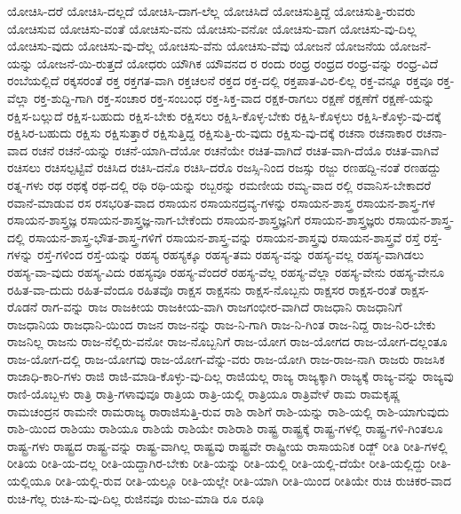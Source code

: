 {ಯೋಚಿಸಿ-ದರೆ
ಯೋಚಿಸಿ-ದಲ್ಲದೆ
ಯೋಚಿಸಿ-ದಾಗ-ಲೆಲ್ಲ
ಯೋಚಿಸಿದೆ
ಯೋಚಿಸುತ್ತಿದ್ದೆ
ಯೋಚಿಸುತ್ತಿ-ರುವರು
ಯೋಚಿಸುವ
ಯೋಚಿಸು-ವಂತೆ
ಯೋಚಿಸು-ವನು
ಯೋಚಿಸು-ವನೋ
ಯೋಚಿಸು-ವಾಗ
ಯೋಚಿಸು-ವು-ದಿಲ್ಲ
ಯೋಚಿಸು-ವುದು
ಯೋಚಿಸು-ವು-ದೆಲ್ಲ
ಯೋಚಿಸು-ವೆನು
ಯೋಚಿಸು-ವೆವು
ಯೋಜನೆ
ಯೋಜನೆಯ
ಯೋಜನೆ-ಯನ್ನು
ಯೋಜನೆ-ಯಿ-ರುತ್ತದೆ
ಯೋಧರು
ಯೌಗಿಕ
ಯೌವನದ
ರ
ರಂದು
ರಂಧ್ರ
ರಂಧ್ರದ
ರಂಧ್ರ-ವನ್ನು
ರಂಧ್ರ-ವಿದೆ
ರಂಬೆಯಲ್ಲಿದೆ
ರಕ್ಕಸರಂತೆ
ರಕ್ತ
ರಕ್ತಗತ-ವಾಗಿ
ರಕ್ತಚಲನೆ
ರಕ್ತದ
ರಕ್ತ-ದಲ್ಲಿ
ರಕ್ತಪಾತ-ವಿರ-ಲಿಲ್ಲ
ರಕ್ತ-ವನ್ನೂ
ರಕ್ತವೂ
ರಕ್ತ-ವೆಲ್ಲಾ
ರಕ್ತ-ಶುದ್ದಿ-ಗಾಗಿ
ರಕ್ತ-ಸಂಚಾರ
ರಕ್ತ-ಸಂಬಂಧ
ರಕ್ತ-ಸಿಕ್ತ-ವಾದ
ರಕ್ಷಕ-ರಾಗಲು
ರಕ್ಷಣೆ
ರಕ್ಷಣೆಗೆ
ರಕ್ಷಣೆ-ಯನ್ನು
ರಕ್ಷಿಸ-ಬಲ್ಲುದೆ
ರಕ್ಷಿಸ-ಬಹುದು
ರಕ್ಷಿಸ-ಬೇಕು
ರಕ್ಷಿಸಲು
ರಕ್ಷಿಸಿ-ಕೊಳ್ಳ-ಬೇಕು
ರಕ್ಷಿಸಿ-ಕೊಳ್ಳಲು
ರಕ್ಷಿಸಿ-ಕೊಳ್ಳು-ವು-ದಕ್ಕೆ
ರಕ್ಷಿಸಿರ-ಬಹುದು
ರಕ್ಷಿಸು
ರಕ್ಷಿಸುತ್ತಾರೆ
ರಕ್ಷಿಸುತ್ತಿದ್ದ
ರಕ್ಷಿಸುತ್ತಿ-ರು-ವುದು
ರಕ್ಷಿಸು-ವು-ದಕ್ಕೆ
ರಚನಾ
ರಚನಾಕಾರ
ರಚನಾ-ವಾದ
ರಚನೆ
ರಚನೆ-ಯನ್ನು
ರಚನೆ-ಯಾಗಿ-ದೆಯೋ
ರಚನೆಯೇ
ರಚಿತ-ವಾಗಿದೆ
ರಚಿತ-ವಾಗಿ-ದೆಯೊ
ರಚಿತ-ವಾಗಿವೆ
ರಚಿಸಲು
ರಚಿಸಲ್ಪಟ್ಟಿವೆ
ರಚಿಸಿದ
ರಚಿಸಿ-ದನೊ
ರಚಿಸಿ-ದರೊ
ರಜಸ್ಸಿ-ನಿಂದ
ರಜಸ್ಸು
ರಜ್ಜು
ರಣಹದ್ದಿ-ನಂತೆ
ರಣಹದ್ದು
ರತ್ನ-ಗಳು
ರಥ
ರಥಕ್ಕೆ
ರಥ-ದಲ್ಲಿ
ರಥಿ
ರಥಿ-ಯನ್ನು
ರಬ್ಬರನ್ನು
ರಮಣೀಯ
ರಮ್ಯ-ವಾದ
ರಲ್ಲಿ
ರವಾನಿಸ-ಬೇಕಾದರೆ
ರವಾನೆ-ಮಾಡುವ
ರಸ
ರಸಭರಿತ-ವಾದ
ರಸಾಯನ
ರಸಾಯನದ್ರವ್ಯ-ಗಳನ್ನು
ರಸಾಯನ-ಶಾಸ್ತ್ರ
ರಸಾಯನ-ಶಾಸ್ತ್ರ-ಗಳ
ರಸಾಯನ-ಶಾಸ್ತ್ರಜ್ಞ
ರಸಾಯನ-ಶಾಸ್ತ್ರಜ್ಞ-ನಾಗ-ಬೇಕೆಂದು
ರಸಾಯನ-ಶಾಸ್ತ್ರಜ್ಞನಿಗೆ
ರಸಾಯನ-ಶಾಸ್ತ್ರಜ್ಞರು
ರಸಾಯನ-ಶಾಸ್ತ್ರ-ದಲ್ಲಿ
ರಸಾಯನ-ಶಾಸ್ತ್ರ-ಭೌತ-ಶಾಸ್ತ್ರ-ಗಳಿಗೆ
ರಸಾಯನ-ಶಾಸ್ತ್ರ-ವನ್ನು
ರಸಾಯನ-ಶಾಸ್ತ್ರವು
ರಸಾಯನ-ಶಾಸ್ತ್ರವೆ
ರಸ್ತೆ
ರಸ್ತೆ-ಗಳನ್ನು
ರಸ್ತೆ-ಗಳಿಂದ
ರಸ್ತೆ-ಯನ್ನು
ರಹಸ್ಯ
ರಹಸ್ಯಕ್ಕೂ
ರಹಸ್ಯ-ತಮ
ರಹಸ್ಯ-ವನ್ನು
ರಹಸ್ಯ-ವಲ್ಲ
ರಹಸ್ಯ-ವಾಗಿಡಲು
ರಹಸ್ಯ-ವಾ-ವುದು
ರಹಸ್ಯ-ವಿದು
ರಹಸ್ಯವೂ
ರಹಸ್ಯ-ವೆಂದರೆ
ರಹಸ್ಯ-ವೆಲ್ಲ
ರಹಸ್ಯ-ವೆಲ್ಲಾ
ರಹಸ್ಯ-ವೇನು
ರಹಸ್ಯ-ವೇನೂ
ರಹಿತ-ವಾ-ದುದು
ರಹಿತ-ವೆಂದೂ
ರಹಿತವೊ
ರಾಕ್ಷಸ
ರಾಕ್ಷಸನು
ರಾಕ್ಷಸ-ನೊಬ್ಬನು
ರಾಕ್ಷಸರ
ರಾಕ್ಷಸ-ರಂತೆ
ರಾಕ್ಷಸ-ರೊಡನೆ
ರಾಗ-ವನ್ನು
ರಾಜ
ರಾಜಕೀಯ
ರಾಜಕೀಯ-ವಾಗಿ
ರಾಜಗಂಭೀರ-ವಾಗಿದೆ
ರಾಜಧಾನಿ
ರಾಜಧಾನಿಗೆ
ರಾಜಧಾನಿಯ
ರಾಜಧಾನಿ-ಯಿಂದ
ರಾಜನ
ರಾಜ-ನನ್ನು
ರಾಜ-ನಿ-ಗಾಗಿ
ರಾಜ-ನಿ-ಗಿಂತ
ರಾಜ-ನಿದ್ದ
ರಾಜ-ನಿರ-ಬೇಕು
ರಾಜನಿಲ್ಲ
ರಾಜನು
ರಾಜ-ನೆಲ್ಲಿರು-ವನೋ
ರಾಜ-ನೊಬ್ಬನಿಗೆ
ರಾಜ-ಯೋಗ
ರಾಜ-ಯೋಗದ
ರಾಜ-ಯೋಗ-ದಲ್ಲಂತೂ
ರಾಜ-ಯೋಗ-ದಲ್ಲಿ
ರಾಜ-ಯೋಗವು
ರಾಜ-ಯೋಗ-ವೆನ್ನು-ವರು
ರಾಜ-ಯೋಗಿ
ರಾಜ-ರಾಜ-ನಾಗಿ
ರಾಜರು
ರಾಜಸಿಕ
ರಾಜಾಧಿ-ಕಾರಿ-ಗಳು
ರಾಜಿ
ರಾಜಿ-ಮಾಡಿ-ಕೊಳ್ಳು-ವು-ದಿಲ್ಲ
ರಾಜಿಯಲ್ಲ
ರಾಜ್ಯ
ರಾಜ್ಯಕ್ಕಾಗಿ
ರಾಜ್ಯಕ್ಕೆ
ರಾಜ್ಯ-ವನ್ನು
ರಾಜ್ಯವು
ರಾಣಿ-ಯೊಬ್ಬಳು
ರಾತ್ರಿ
ರಾತ್ರಿ-ಗಳಾವುವೂ
ರಾತ್ರಿಯ
ರಾತ್ರಿ-ಯಲ್ಲಿ
ರಾತ್ರಿಯೂ
ರಾತ್ರಿವೇಳೆ
ರಾಮ
ರಾಮಕೃಷ್ಣ
ರಾಮಚಂದ್ರನ
ರಾಮನೇ
ರಾಮರಾಜ್ಯ
ರಾರಾಜಿಸುತ್ತಿ-ರುವ
ರಾಶಿ
ರಾಶಿಗೆ
ರಾಶಿ-ಯನ್ನು
ರಾಶಿ-ಯಲ್ಲಿ
ರಾಶಿ-ಯಾಗುವುದು
ರಾಶಿ-ಯಿಂದ
ರಾಶಿಯು
ರಾಶಿಯೂ
ರಾಶಿಯೆ
ರಾಶಿಯೇ
ರಾಶಿರಾಶಿ
ರಾಷ್ಟ್ರ
ರಾಷ್ಟ್ರಕ್ಕೆ
ರಾಷ್ಟ್ರ-ಗಳಲ್ಲಿ
ರಾಷ್ಟ್ರ-ಗಳಿ-ಗಿಂತಲೂ
ರಾಷ್ಟ್ರ-ಗಳು
ರಾಷ್ಟ್ರದ
ರಾಷ್ಟ್ರ-ವನ್ನು
ರಾಷ್ಟ್ರ-ವಾಗಿಲ್ಲ
ರಾಷ್ಟ್ರವು
ರಾಷ್ಟ್ರವೇ
ರಾಷ್ಟ್ರೀಯ
ರಾಸಾಯನಿಕ
ರಿಡ್ಜ್
ರೀತಿ
ರೀತಿ-ಗಳಲ್ಲಿ
ರೀತಿಯ
ರೀತಿ-ಯ-ದಲ್ಲ
ರೀತಿ-ಯದ್ದಾಗಿರ-ಬೇಕು
ರೀತಿ-ಯನ್ನು
ರೀತಿ-ಯಲ್ಲಿ
ರೀತಿ-ಯಲ್ಲಿ-ದೆಯೇ
ರೀತಿ-ಯಲ್ಲಿದ್ದು
ರೀತಿ-ಯಲ್ಲಿಯೂ
ರೀತಿ-ಯಲ್ಲಿ-ರುವ
ರೀತಿ-ಯಲ್ಲೂ
ರೀತಿ-ಯಲ್ಲೇ
ರೀತಿ-ಯಾಗಿ
ರೀತಿ-ಯಿಂದ
ರೀತಿಯೇ
ರುಚಿ
ರುಚಿಕರ-ವಾದ
ರುಚಿ-ಗೆಲ್ಲ
ರುಚಿ-ಸು-ವು-ದಿಲ್ಲ
ರುಜಿನವೂ
ರುಜು-ಮಾಡಿ
ರೂ
ರೂಢಿ
}
